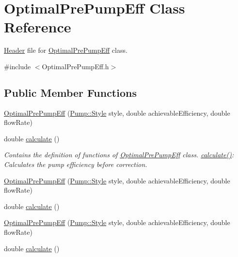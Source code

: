 \hypertarget{class_optimal_pre_pump_eff}{}\section{Optimal\+Pre\+Pump\+Eff Class Reference}
\label{class_optimal_pre_pump_eff}


\hyperlink{class_header}{Header} file for \hyperlink{class_optimal_pre_pump_eff}{Optimal\+Pre\+Pump\+Eff} class.  




{\ttfamily \#include $<$Optimal\+Pre\+Pump\+Eff.\+h$>$}

\subsection*{Public Member Functions}
\begin{DoxyCompactItemize}
\item 
\hyperlink{class_optimal_pre_pump_eff_ade47f817645cb2d503bd99f132bec1e6}{Optimal\+Pre\+Pump\+Eff} (\hyperlink{class_pump_aef354601ce4218258cc898b35a1e90ff}{Pump\+::\+Style} style, double achievable\+Efficiency, double flow\+Rate)
\item 
double \hyperlink{class_optimal_pre_pump_eff_a7ced63984a89975c4f8f54642701d841}{calculate} ()
\begin{DoxyCompactList}\small\item\em Contains the definition of functions of \hyperlink{class_optimal_pre_pump_eff}{Optimal\+Pre\+Pump\+Eff} class. \hyperlink{class_optimal_pre_pump_eff_a7ced63984a89975c4f8f54642701d841}{calculate()}\+: Calculates the pump efficiency before correction. \end{DoxyCompactList}\item 
\hyperlink{class_optimal_pre_pump_eff_ade47f817645cb2d503bd99f132bec1e6}{Optimal\+Pre\+Pump\+Eff} (\hyperlink{class_pump_aef354601ce4218258cc898b35a1e90ff}{Pump\+::\+Style} style, double achievable\+Efficiency, double flow\+Rate)
\item 
double \hyperlink{class_optimal_pre_pump_eff_a7ced63984a89975c4f8f54642701d841}{calculate} ()
\item 
\hyperlink{class_optimal_pre_pump_eff_ade47f817645cb2d503bd99f132bec1e6}{Optimal\+Pre\+Pump\+Eff} (\hyperlink{class_pump_aef354601ce4218258cc898b35a1e90ff}{Pump\+::\+Style} style, double achievable\+Efficiency, double flow\+Rate)
\item 
double \hyperlink{class_optimal_pre_pump_eff_a7ced63984a89975c4f8f54642701d841}{calculate} ()
\end{DoxyCompactItemize}


